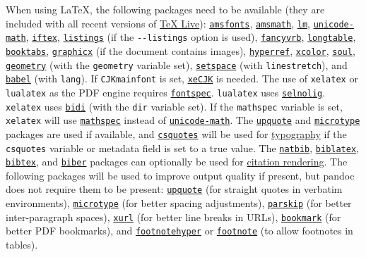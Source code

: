 \documentclass[
  a4paper,
]{article}
\begin{document}
When using LaTeX, the following packages need to be available (they are
included with all recent versions of
\href{https://www.tug.org/texlive/}{TeX Live}):
\href{https://ctan.org/pkg/amsfonts}{\texttt{amsfonts}},
\href{https://ctan.org/pkg/amsmath}{\texttt{amsmath}},
\href{https://ctan.org/pkg/lm}{\texttt{lm}},
\href{https://ctan.org/pkg/unicode-math}{\texttt{unicode-math}},
\href{https://ctan.org/pkg/iftex}{\texttt{iftex}},
\href{https://ctan.org/pkg/listings}{\texttt{listings}} (if the
\texttt{-\/-listings} option is used),
\href{https://ctan.org/pkg/fancyvrb}{\texttt{fancyvrb}},
\href{https://ctan.org/pkg/longtable}{\texttt{longtable}},
\href{https://ctan.org/pkg/booktabs}{\texttt{booktabs}},
\href{https://ctan.org/pkg/graphicx}{\texttt{graphicx}} (if the document
contains images),
\href{https://ctan.org/pkg/hyperref}{\texttt{hyperref}},
\href{https://ctan.org/pkg/xcolor}{\texttt{xcolor}},
\href{https://ctan.org/pkg/soul}{\texttt{soul}},
\href{https://ctan.org/pkg/geometry}{\texttt{geometry}} (with the
\texttt{geometry} variable set),
\href{https://ctan.org/pkg/setspace}{\texttt{setspace}} (with
\texttt{linestretch}), and
\href{https://ctan.org/pkg/babel}{\texttt{babel}} (with \texttt{lang}).
If \texttt{CJKmainfont} is set,
\href{https://ctan.org/pkg/xecjk}{\texttt{xeCJK}} is needed. The use of
\texttt{xelatex} or \texttt{lualatex} as the PDF engine requires
\href{https://ctan.org/pkg/fontspec}{\texttt{fontspec}}.
\texttt{lualatex} uses
\href{https://ctan.org/pkg/selnolig}{\texttt{selnolig}}.
\texttt{xelatex} uses \href{https://ctan.org/pkg/bidi}{\texttt{bidi}}
(with the \texttt{dir} variable set). If the \texttt{mathspec} variable
is set, \texttt{xelatex} will use
\href{https://ctan.org/pkg/mathspec}{\texttt{mathspec}} instead of
\href{https://ctan.org/pkg/unicode-math}{\texttt{unicode-math}}. The
\href{https://ctan.org/pkg/upquote}{\texttt{upquote}} and
\href{https://ctan.org/pkg/microtype}{\texttt{microtype}} packages are
used if available, and
\href{https://ctan.org/pkg/csquotes}{\texttt{csquotes}} will be used for
\protect\hyperlink{typography}{typography} if the \texttt{csquotes}
variable or metadata field is set to a true value. The
\href{https://ctan.org/pkg/natbib}{\texttt{natbib}},
\href{https://ctan.org/pkg/biblatex}{\texttt{biblatex}},
\href{https://ctan.org/pkg/bibtex}{\texttt{bibtex}}, and
\href{https://ctan.org/pkg/biber}{\texttt{biber}} packages can
optionally be used for \protect\hyperlink{citation-rendering}{citation
rendering}. The following packages will be used to improve output
quality if present, but pandoc does not require them to be present:
\href{https://ctan.org/pkg/upquote}{\texttt{upquote}} (for straight
quotes in verbatim environments),
\href{https://ctan.org/pkg/microtype}{\texttt{microtype}} (for better
spacing adjustments),
\href{https://ctan.org/pkg/parskip}{\texttt{parskip}} (for better
inter-paragraph spaces), \href{https://ctan.org/pkg/xurl}{\texttt{xurl}}
(for better line breaks in URLs),
\href{https://ctan.org/pkg/bookmark}{\texttt{bookmark}} (for better PDF
bookmarks), and
\href{https://ctan.org/pkg/footnotehyper}{\texttt{footnotehyper}} or
\href{https://ctan.org/pkg/footnote}{\texttt{footnote}} (to allow
footnotes in tables).
\end{document}
